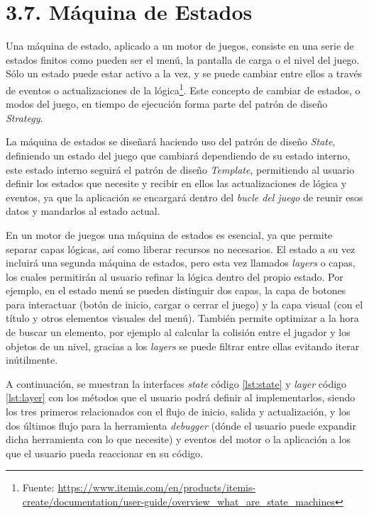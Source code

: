 \section*{3.7. Máquina de Estados}\label{sec:states-machine}

Una máquina de estado, aplicado a un motor de juegos, consiste en una serie de estados finitos
como pueden ser el menú, la pantalla de carga o el nivel del juego. Sólo un estado puede estar 
activo a la vez, y se puede cambiar entre ellos a través de eventos o actualizaciones de la
lógica\footnote{Fuente: \url{https://www.itemis.com/en/products/itemis-create/documentation/user-guide/overview_what_are_state_machines}}.
Este concepto de cambiar de estados, o modos del juego, en tiempo de ejecución forma parte del patrón de diseño \textit{Strategy}\cite{strategy-pattern}.

La máquina de estados se diseñará haciendo uso del patrón de diseño \textit{State}\cite{state-pattern},
definiendo un estado del juego que cambiará dependiendo de su estado interno, este estado interno seguirá el patrón de 
diseño \textit{Template}\cite{template-pattern}, permitiendo al usuario definir los estados que necesite y recibir en ellos
las actualizaciones de lógica y eventos, ya que la aplicación se encargará dentro del \textit{bucle del juego} de reunir esos datos
y mandarlos al estado actual.

En un motor de juegos una máquina de estados es esencial, ya que permite separar capas lógicas, así como liberar
recursos no necesarios. El estado a su vez incluirá una segunda máquina de estados, pero esta vez llamados
\textit{layers} o capas, los cuales permitirán al usuario refinar la lógica dentro del propio estado. Por ejemplo,
en el estado menú se pueden distinguir dos capas, la capa de botones para interactuar (botón de inicio, cargar o cerrar el juego)
y la capa visual (con el título y otros elementos visuales del menú). También permite optimizar a la hora de buscar un elemento,
por ejemplo al calcular la colisión entre el jugador y los objetos de un nivel, gracias a los \textit{layers} se puede filtrar entre ellas evitando
iterar inútilmente.

A continuación, se muestran la interfaces \textit{state} código \ref{lst:state} y \textit{layer} 
código \ref{lst:layer} con los métodos que el usuario podrá definir al implementarlos, siendo los tres primeros
relacionados con el flujo de inicio, salida y actualización, y los dos últimos flujo para la herramienta \textit{debugger}
(dónde el usuario puede expandir dicha herramienta con lo que necesite) y eventos del motor o la aplicación a los que
el usuario pueda reaccionar en su código.



